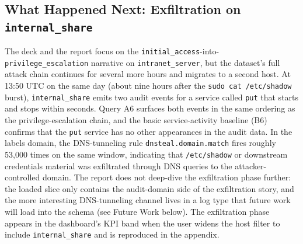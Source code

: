 \subsection{What Happened Next: Exfiltration on \texttt{internal\_share}}
The deck and the report focus on the
\texttt{initial\_access}-into-\texttt{privilege\_escalation} narrative
on \texttt{intranet\_server}, but the dataset's full attack chain
continues for several more hours and migrates to a second host. At
13:50 UTC on the same day (about nine hours after the
\texttt{sudo cat /etc/shadow} burst), \texttt{internal\_share} emits
two audit events for a service called \texttt{put} that starts and
stops within seconds. Query A6 surfaces both events in the same
ordering as the privilege-escalation chain, and the basic
service-activity baseline (B6) confirms that the \texttt{put} service
has no other appearances in the audit data. In the labels domain, the
DNS-tunneling rule \texttt{dnsteal.domain.match} fires roughly
53{,}000 times on the same window, indicating that
\texttt{/etc/shadow} or downstream credentials material was
exfiltrated through DNS queries to the attacker-controlled domain.
The report does not deep-dive the exfiltration phase further: the
loaded slice only contains the audit-domain side of the
exfiltration story, and the more interesting DNS-tunneling channel
lives in a log type that future work will load into the schema (see
Future Work below). The exfiltration phase appears in the dashboard's
KPI band when the user widens the host filter to include
\texttt{internal\_share} and is reproduced in the appendix.

